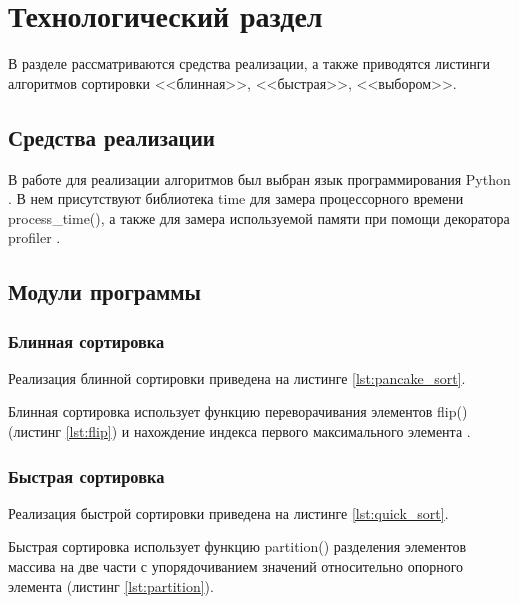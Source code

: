 \chapter{Технологический раздел}
В разделе рассматриваются средства реализации, а также приводятся листинги алгоритмов сортировки <<блинная>>, <<быстрая>>, <<выбором>>.

\section{Средства реализации}
В работе для реализации алгоритмов был выбран язык программирования Python \cite{python}. В нем присутствуют библиотека time \cite{process_time} для замера процессорного времени process\_time(), а также для замера используемой памяти при помощи декоратора profiler \cite{profiler}.

\section{Модули программы}
\subsection{Блинная сортировка}
Реализация блинной сортировки приведена на листинге \ref{lst:pancake_sort}.

Блинная сортировка использует функцию переворачивания элементов flip() (листинг \ref{lst:flip}) и нахождение индекса первого максимального элемента .

\newpage

\subsection{Быстрая сортировка}
Реализация быстрой сортировки приведена на листинге \ref{lst:quick_sort}.

Быстрая сортировка использует функцию partition() разделения элементов массива на две части с упорядочиванием значений относительно опорного элемента (листинг \ref{lst:partition}).

